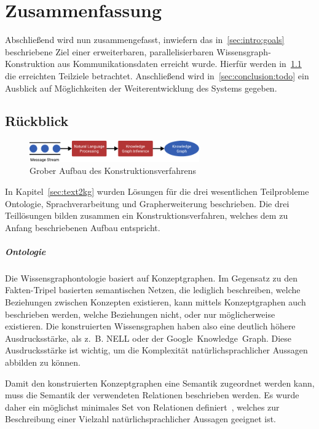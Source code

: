 \chapter{Zusammenfassung}%
\label{sec:conclusion}

Abschließend wird nun zusammengefasst, inwiefern das in~\ref{sec:intro:goals} beschriebene Ziel einer erweiterbaren, parallelisierbaren Wissensgraph-Konstruktion aus Kommunikationsdaten erreicht wurde.
Hierfür werden in~\ref{sec:conclusion:review} die erreichten Teilziele betrachtet.
Anschließend wird in~\ref{sec:conclusion:todo} ein Ausblick auf Möglichkeiten der Weiterentwicklung des Systems gegeben.

\section{Rückblick}%
\label{sec:conclusion:review}

\begin{figure}[h]
	\centering
	\includegraphics[width=0.65\textwidth]{gfx/conclusion/overview.pdf}
	\caption{Grober Aufbau des Konstruktionsverfahrens}\label{fig:conclusion:overview}
\end{figure}
In Kapitel~\ref{sec:text2kg} wurden Lösungen für die drei wesentlichen Teilprobleme Ontologie, Sprachverarbeitung und Grapherweiterung beschrieben.
Die drei Teillösungen bilden zusammen ein Konstruktionsverfahren, welches dem zu Anfang beschriebenen Aufbau entspricht.

\paragraph{Ontologie}
Die Wissensgraphontologie basiert auf Konzeptgraphen.
Im Gegensatz zu den Fakten-Tripel basierten semantischen Netzen, die lediglich beschreiben, welche Beziehungen zwischen Konzepten existieren, kann mittels Konzeptgraphen auch beschrieben werden, welche Beziehungen nicht, oder nur möglicherweise existieren.
Die konstruierten Wissensgraphen haben also eine deutlich höhere Ausdrucksstärke, als z.~B. NELL oder der Google~Knowledge~Graph.
Diese Ausdrucksstärke ist wichtig, um die Komplexität natürlichsprachlicher Aussagen abbilden zu können.

Damit den konstruierten Konzeptgraphen eine Semantik zugeordnet werden kann, muss die Semantik der verwendeten Relationen beschrieben werden.
Es wurde daher ein möglichst minimales Set von Relationen definiert~, welches zur Beschreibung einer Vielzahl natürlichsprachlicher Aussagen geeignet ist.


